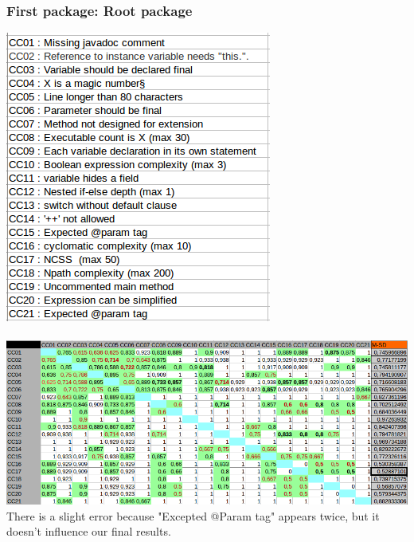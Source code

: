 \documentclass{article}
\begin{document}
\subsubsection{First package: Root package }
\includegraphics[scale=0.5]{names00.png}\\ \\
\includegraphics[scale=0.5]{00.png} \\
There is a slight error because "Excepted @Param tag" appears twice, but it doesn't influence our final results.
\end{document}
